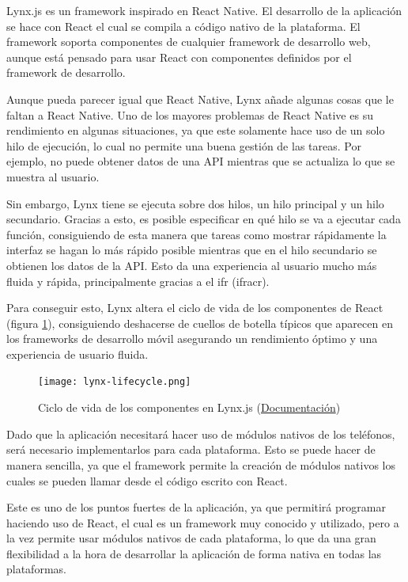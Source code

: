 Lynx.js es un framework inspirado en React Native. El desarrollo de la aplicación se hace con React el cual se compila a código nativo de la plataforma. El framework soporta componentes de cualquier framework de desarrollo web, aunque está pensado para usar React con componentes definidos por el framework de desarrollo.

Aunque pueda parecer igual que React Native, Lynx añade algunas cosas que le faltan a React Native. Uno de los mayores problemas de React Native es su rendimiento en algunas situaciones, ya que este solamente hace uso de un solo hilo de ejecución, lo cual no permite una buena gestión de las tareas. Por ejemplo, no puede obtener datos de una API mientras que se actualiza lo que se muestra al usuario.

Sin embargo, Lynx tiene se ejecuta sobre dos hilos, un hilo principal y un hilo secundario.
Gracias a esto, es posible especificar en qué hilo se va a ejecutar cada función, consiguiendo de esta manera que tareas como mostrar rápidamente la interfaz se hagan lo más rápido posible mientras que en el hilo secundario se obtienen los datos de la API.
Esto da una experiencia al usuario mucho más fluida y rápida, principalmente gracias a el \gls{ifr} (\acrshort{ifracr}).

Para conseguir esto, Lynx altera el ciclo de vida de los componentes de React (figura \ref{fig:lynx-component-lifecycle}), consiguiendo deshacerse de cuellos de botella típicos que aparecen en los frameworks de desarrollo móvil asegurando un rendimiento óptimo y una experiencia de usuario fluida.

\begin{figure}[h]
    \begin{center}
        \texttt{[image: lynx-lifecycle.png]}
    \end{center}
    \caption{Ciclo de vida de los componentes en Lynx.js (\href{https://lynxjs.org/react/lifecycle.html}{Documentación})}
    \label{fig:lynx-component-lifecycle}
\end{figure}


Dado que la aplicación necesitará hacer uso de módulos nativos de los teléfonos, será necesario implementarlos para cada plataforma.
Esto se puede hacer de manera sencilla, ya que el framework permite la creación de módulos nativos los cuales se pueden llamar desde el código escrito con React.

Este es uno de los puntos fuertes de la aplicación, ya que permitirá programar haciendo uso de React, el cual es un framework muy conocido y utilizado, pero a la vez permite usar módulos nativos de cada plataforma, lo que da una gran flexibilidad a la hora de desarrollar la aplicación de forma nativa en todas las plataformas.

